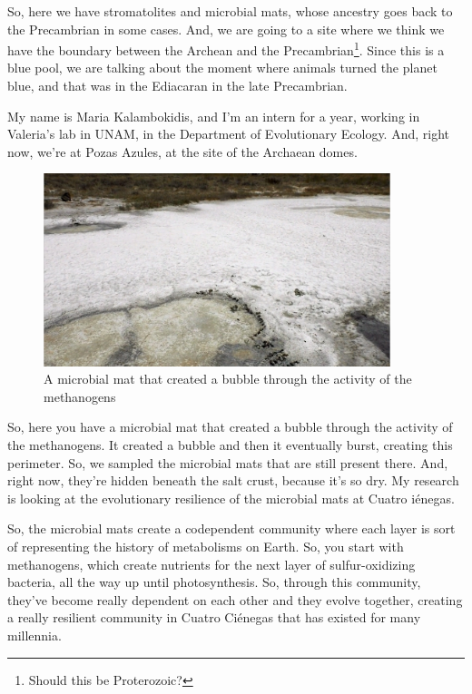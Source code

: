 \documentclass[]{article}
\begin{document}
So, here we have stromatolites and microbial mats, whose ancestry goes back
to the Precambrian in some cases. And, we are going to a site where we think we have the boundary between the Archean and the Precambrian\footnote{Should this be Proterozoic?}. Since this is a blue pool, we are talking about the moment where animals turned the planet blue, and that was in the Ediacaran in the late Precambrian.

My name is Maria Kalambokidis, and I'm an intern for a year, working in Valeria's lab in UNAM, in the Department of Evolutionary Ecology. And, right now, we're at Pozas Azules, at the site of the Archaean domes. 

\begin{figure}[h!]
	\caption{A microbial mat that created a bubble through the activity of the methanogens} 
	\includegraphics[width=0.9\textwidth]{CuatroCienegas3}
\end{figure}

So, here you have a microbial mat that created a bubble through the activity of the methanogens. It created a bubble and then it eventually burst, creating this perimeter. So, we sampled the microbial mats that are still present there. And, right now, they're hidden beneath the salt crust, because it's so dry. My research is looking at the evolutionary resilience of the microbial mats at Cuatro i\'enegas.

So, the microbial mats create a codependent community where each layer is sort of representing the history of metabolisms on Earth. So, you start with methanogens, 
which create nutrients for the next layer of sulfur-oxidizing bacteria, all the way up until photosynthesis. So, through this community, they've become really dependent on each other and they evolve together, creating a really resilient community in Cuatro  Ci\'enegas that has existed for many millennia.
\end{document}
